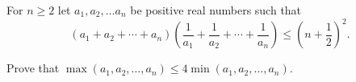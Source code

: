 For $ n\geq2$ let $ a_1, a_2, \ldots a_n$ be positive real numbers such that\[ (a_1 + a_2 + \cdots + a_n)\left(\frac {1}{a_1} + \frac {1}{a_2} + \cdots + \frac {1}{a_n}\right) \leq \left(n + \frac {1}{2}\right)^2.

\]

Prove that $ \max(a_1, a_2, \ldots, a_n)\leq 4\min(a_1, a_2, \ldots, a_n)$.